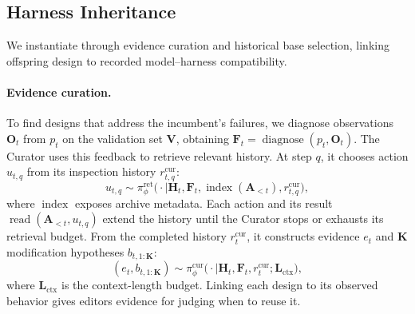 \documentclass[11pt,a4paper]{article}
\begin{document}
\subsection{Harness Inheritance}
\label{sec:harness-inheritance}
We instantiate  through evidence curation and historical base selection, linking offspring design to recorded model--harness compatibility.

\paragraph{Evidence curation.}
To find designs that address the incumbent's failures, we diagnose observations $\mathbf{O}_t$ from $p_t$ on the validation set $\mathbf{V}$, obtaining $\mathbf{F}_t=\operatorname{diagnose}(p_t,\mathbf{O}_t)$. The Curator uses this feedback to retrieve relevant history. At step $q$, it chooses action $u_{t,q}$ from its inspection history $r_{t,q}^{\mathrm{cur}}$:
\begin{equation}
u_{t,q}\sim\pi_\phi^{\mathrm{ret}}\bigl(\cdot\mid\mathbf{H}_t,\mathbf{F}_t,\operatorname{index}(\mathbf{A}_{<t}),r_{t,q}^{\mathrm{cur}}\bigr),
\label{eq:lineage-retrieval}
\end{equation}
where $\operatorname{index}$ exposes archive metadata. Each action and its result $\operatorname{read}(\mathbf{A}_{<t},u_{t,q})$ extend the history until the Curator stops or exhausts its retrieval budget. From the completed history $r_t^{\mathrm{cur}}$, it constructs evidence $e_t$ and $\mathbf{K}$ modification hypotheses $b_{t,1:\mathbf{K}}$:
\begin{equation}
(e_t,b_{t,1:\mathbf{K}})\sim\pi_\phi^{\mathrm{cur}}\bigl(\cdot\mid\mathbf{H}_t,\mathbf{F}_t,r_t^{\mathrm{cur}};\mathbf{L}_{\mathrm{ctx}}\bigr),
\label{eq:lineage-curation}
\end{equation}
where $\mathbf{L}_{\mathrm{ctx}}$ is the context-length budget. Linking each design to its observed behavior gives editors evidence for judging when to reuse it.
\end{document}
